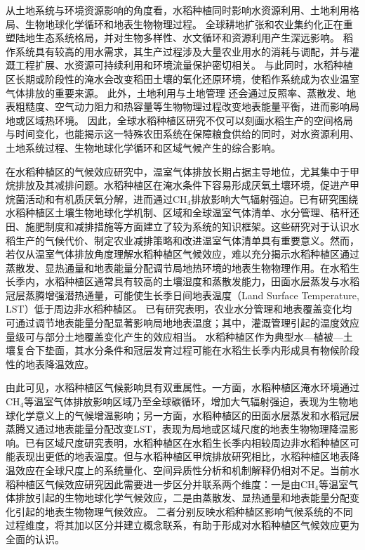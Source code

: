 从土地系统与环境资源影响的角度看，水稻种植同时影响水资源利用、土地利用格局、生物地球化学循环和地表生物物理过程。
全球耕地扩张和农业集约化正在重塑陆地生态系统格局\cite{Foley2005,Foley2011Nature,Potapov2022,Zabel2019}，并对生物多样性、水文循环和资源利用产生深远影响。
稻作系统具有较高的用水需求，其生产过程涉及大量农业用水的消耗与调配，并与灌溉工程扩展、水资源可持续利用和环境流量保护密切相关\cite{Jagermeyr2017NatCommun,Mehta2024NatureWater,McDermid2023Irrigation}。
与此同时，水稻种植区长期或阶段性的淹水会改变稻田土壤的氧化还原环境，使稻作系统成为农业温室气体排放的重要来源\cite{Zhang2020NatCommun,Qian2023RiceGHG,Carlson2017NatClimate}。
此外，土地利用与土地管理%
还会通过反照率、蒸散发、地表粗糙度、空气动力阻力和热容量等生物物理过程改变地表能量平衡\cite{Bright2017LCMC,Duveiller2018Energy,Luyssaert2014NatClimate}，进而影响局地或区域热环境\cite{Chen2024Croplands}。
因此，全球水稻种植区研究不仅可以刻画水稻生产的空间格局与时间变化，也能揭示这一特殊农田系统在保障粮食供给的同时，对水资源利用、土地系统过程、生物地球化学循环和区域气候产生的综合影响。

在水稻种植区的气候效应研究中，温室气体排放长期占据主导地位，尤其集中于甲烷排放及其减排问题。水稻种植区在淹水条件下容易形成厌氧土壤环境，促进产甲烷菌活动和有机质厌氧分解\cite{Zhang2020NatCommun,Qian2023RiceGHG}，进而通过CH$_4$排放影响大气辐射强迫。已有研究围绕水稻种植区土壤生物地球化学机制、区域和全球温室气体清单、水分管理、秸秆还田、施肥制度和减排措施等方面建立了较为系统的知识框架\cite{Qian2023RiceGHG,Zhang2020NatCommun}。这些研究对于认识水稻生产的气候代价、制定农业减排策略和改进温室气体清单具有重要意义。然而，若仅从温室气体排放角度理解水稻种植区气候效应，难以充分揭示水稻种植区通过蒸散发、显热通量和地表能量分配调节局地热环境的地表生物物理作用。在水稻生长季内，水稻种植区通常具有较高的土壤湿度和蒸散发能力，田面水层蒸发与水稻冠层蒸腾增强潜热通量，可能使生长季日间地表温度（Land Surface Temperature, LST）低于周边非水稻种植区。
已有研究表明，农业水分管理和地表覆盖变化均可通过调节地表能量分配显著影响局地地表温度；其中，灌溉管理引起的温度效应量级可与部分土地覆盖变化产生的效应相当\cite{Thiery2020Irrigation,McDermid2023Irrigation,Chen2024Croplands,Luyssaert2014NatClimate}。
水稻种植区作为典型水—植被—土壤复合下垫面，其水分条件和冠层发育过程可能在水稻生长季内形成具有物候阶段性的地表降温效应。

由此可见，水稻种植区气候影响具有双重属性。一方面，水稻种植区淹水环境通过CH$_4$等温室气体排放影响区域乃至全球碳循环，增加大气辐射强迫，表现为生物地球化学意义上的气候增温影响；另一方面，水稻种植区的田面水层蒸发和水稻冠层蒸腾又通过地表能量分配改变LST，表现为局地或区域尺度的地表生物物理降温影响。已有区域尺度研究表明，水稻种植区在水稻生长季内相较周边非水稻种植区可能表现出更低的地表温度\cite{Xue2021RemoteSensing,Liu2022AgForMet,Yokohari2001}。但与水稻种植区甲烷排放研究相比，水稻种植区地表降温效应在全球尺度上的系统量化、空间异质性分析和机制解释仍相对不足。当前水稻种植区气候效应研究因此需要进一步区分并联系两个维度：一是由CH$_4$等温室气体排放引起的生物地球化学气候效应，二是由蒸散发、显热通量和地表能量分配变化引起的地表生物物理气候效应。
二者分别反映水稻种植区影响气候系统的不同过程维度，将其加以区分并建立概念联系，有助于形成对水稻种植区气候效应更为全面的认识。

